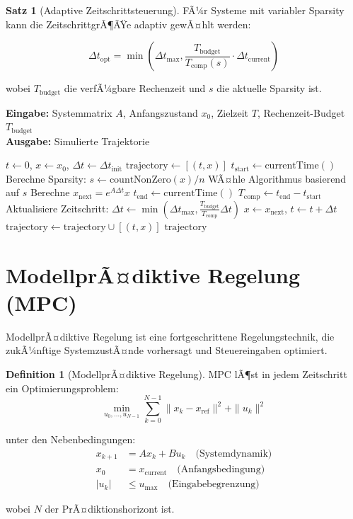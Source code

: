 ﻿\documentclass[a4paper,12pt]{report}
\theoremstyle{definition}
\newtheorem{definition}{Definition}
\newtheorem{satz}{Satz}
\begin{document}
	\begin{satz}[Adaptive Zeitschrittsteuerung]
		FÃ¼r Systeme mit variabler Sparsity kann die ZeitschrittgrÃ¶ÃŸe adaptiv gewÃ¤hlt werden:
		
		\[
		\Delta t_{\text{opt}} = \min\left(\Delta t_{\text{max}}, \frac{T_{\text{budget}}}{T_{\text{comp}}(s)} \cdot \Delta t_{\text{current}}\right)
		\]
		
		wobei $T_{\text{budget}}$ die verfÃ¼gbare Rechenzeit und $s$ die aktuelle Sparsity ist.
	\end{satz}
	
	\begin{algorithm}[H]
		\caption{Adaptive Echtzeit-Simulation}
		\label{alg:adaptive-realtime}
		\textbf{Eingabe:} Systemmatrix $A$, Anfangszustand $x_0$, Zielzeit $T$, Rechenzeit-Budget $T_{\text{budget}}$ \\
		\textbf{Ausgabe:} Simulierte Trajektorie
		\begin{algorithmic}[1]
			\State $t \gets 0$, $x \gets x_0$, $\Delta t \gets \Delta t_{\text{init}}$
			\State $\text{trajectory} \gets [(t, x)]$
			\State $t_{\text{start}} \gets \text{currentTime}()$
			\State Berechne Sparsity: $s \gets \text{countNonZero}(x) / n$
			\State WÃ¤hle Algorithmus basierend auf $s$
			\State Berechne $x_{\text{next}} = e^{A \Delta t} x$
			\State $t_{\text{end}} \gets \text{currentTime}()$
			\State $T_{\text{comp}} \gets t_{\text{end}} - t_{\text{start}}$
			\State Aktualisiere Zeitschritt: $\Delta t \gets \min(\Delta t_{\text{max}}, \frac{T_{\text{budget}}}{T_{\text{comp}}} \Delta t)$
			\State $x \gets x_{\text{next}}$, $t \gets t + \Delta t$
			\State $\text{trajectory} \gets \text{trajectory} \cup [(t, x)]$
			\EndWhile
			\State \Return $\text{trajectory}$
		\end{algorithmic}
	\end{algorithm}
	
	\section{ModellprÃ¤diktive Regelung (MPC)}
	
	ModellprÃ¤diktive Regelung ist eine fortgeschrittene Regelungstechnik, die zukÃ¼nftige SystemzustÃ¤nde vorhersagt und Steuereingaben optimiert.
	
	\begin{definition}[ModellprÃ¤diktive Regelung]
		MPC lÃ¶st in jedem Zeitschritt ein Optimierungsproblem:
		\[
		\min_{u_0, \ldots, u_{N-1}} \sum_{k=0}^{N-1} \|x_k - x_{\text{ref}}\|^2 + \|u_k\|^2
		\]
		
		unter den Nebenbedingungen:
		\begin{align}
			x_{k+1} &= A x_k + B u_k \quad \text{(Systemdynamik)} \\
			x_0 &= x_{\text{current}} \quad \text{(Anfangsbedingung)} \\
			|u_k| &\leq u_{\text{max}} \quad \text{(Eingabebegrenzung)}
		\end{align}
		
		wobei $N$ der PrÃ¤diktionshorizont ist.
	\end{definition}
	
\end{document}
